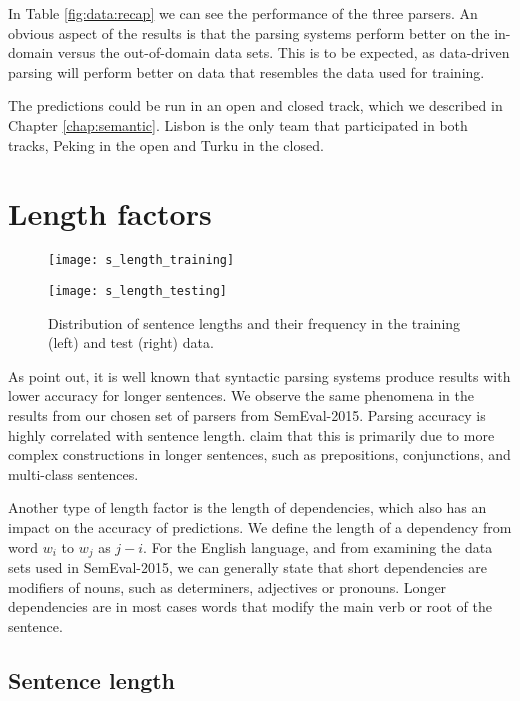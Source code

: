 In Table \ref{fig:data:recap} we can see the performance of the three parsers. An obvious aspect of the results is that the parsing systems perform better on the in-domain versus the out-of-domain data sets. This is to be expected, as data-driven parsing will perform better on data that resembles the data used for training.

The predictions could be run in an open and closed track, which we described in Chapter \ref{chap:semantic}. Lisbon is the only team that participated in both tracks, Peking in the open and Turku in the closed.


\section{Length factors}

\begin{figure}[h]
    \centering
    \begin{minipage}{0.50\textwidth}
        \centering
        \texttt{[image: s\_length\_training]}
    \end{minipage}\hfill
    \begin{minipage}{0.50\textwidth}
        \centering
        \texttt{[image: s\_length\_testing]}
    \end{minipage}
    \caption{Distribution of sentence lengths and their frequency in the training (left) and test (right) data.}
\end{figure}

As  point out, it is well known that syntactic parsing systems produce results with lower accuracy for longer sentences. We observe the same phenomena in the results from our chosen set of parsers from SemEval-2015. Parsing accuracy is highly correlated with sentence length.  claim that this is primarily due to more complex constructions in longer sentences, such as prepositions, conjunctions, and multi-class sentences. 

Another type of length factor is the length of dependencies, which also has an impact on the accuracy of predictions. We define the length of a dependency from word $w_i$ to $w_j$ as $j - i$. For the English language, and from examining the data sets used in SemEval-2015, we can generally state that short dependencies are modifiers of nouns, such as determiners, adjectives or pronouns. Longer dependencies are in most cases words that modify the main verb or root of the sentence. 

\subsection{Sentence length}

